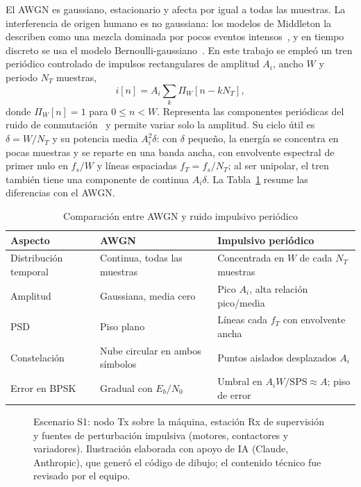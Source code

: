 El AWGN es gaussiano, estacionario y afecta por igual a todas las muestras. La
interferencia de origen humano es no gaussiana: los modelos de Middleton la
describen como una mezcla dominada por pocos eventos intensos~\cite{middleton1977},
y en tiempo discreto se usa el modelo Bernoulli-gaussiano~\cite{ghosh1996}. En
este trabajo se empleó un tren periódico controlado de impulsos rectangulares
de amplitud $A_i$, ancho $W$ y periodo $N_T$ muestras,
\begin{equation}
  i[n]=A_i\sum_{k}\Pi_W[n-kN_T],
  \label{eq:tren}
\end{equation}
donde $\Pi_W[n]=1$ para $0\le n<W$. Representa las componentes periódicas del
ruido de conmutación~\cite{zimmermann2002} y permite variar solo la amplitud.
Su ciclo útil es $\delta=W/N_T$ y su potencia media $A_i^2\delta$: con $\delta$
pequeño, la energía se concentra en pocas muestras y se reparte en una banda
ancha, con envolvente espectral de primer nulo en $f_s/W$ y líneas espaciadas
$f_T=f_s/N_T$; al ser unipolar, el tren también tiene una componente de continua
$A_i\delta$. La Tabla~\ref{tab:awgn_vs_imp} resume las diferencias con el AWGN.

\begin{table}[!t]
\centering
\caption{Comparación entre AWGN y ruido impulsivo periódico}
\label{tab:awgn_vs_imp}
\footnotesize
\setlength{\tabcolsep}{3pt}
\begin{tabular}{@{}p{}p{}p{}@{}}
\toprule
\textbf{Aspecto} & \textbf{AWGN} & \textbf{Impulsivo periódico} \\
\midrule
Distribución temporal & Continua, todas las muestras & Concentrada en $W$ de cada $N_T$ muestras \\
Amplitud & Gaussiana, media cero & Pico $A_i$, alta relación pico/media \\
PSD & Piso plano & Líneas cada $f_T$ con envolvente ancha \\
Constelación & Nube circular en ambos símbolos & Puntos aislados desplazados $A_i$ \\
Error en BPSK & Gradual con $E_b/N_0$ & Umbral en $A_i W/\mathrm{SPS}\approx A$; piso de error \\
\bottomrule
\end{tabular}
\end{table}

\begin{figure}[!t]
\centering
{}
\caption{Escenario S1: nodo Tx sobre la máquina, estación Rx de supervisión y
fuentes de perturbación impulsiva (motores, contactores y variadores).
Ilustración elaborada con apoyo de IA (Claude, Anthropic), que generó el código
de dibujo; el contenido técnico fue revisado por el equipo.}
\label{fig:escenario}
\end{figure}

